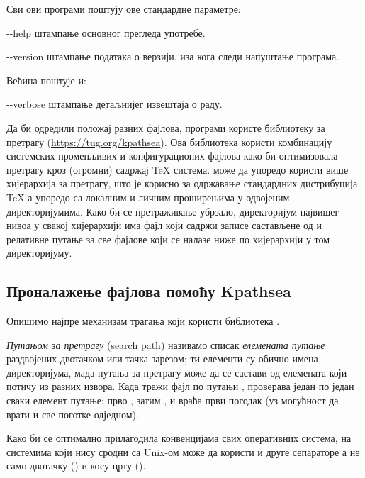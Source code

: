\documentclass{article}
\begin{document}
Сви ови програми поштују ове стандардне \GNU параметре:
\begin{ttdescription}
\item[-{}-help] штампање основног прегледа употребе.
\item[-{}-version] штампање података о верзији, иза кога следи
  напуштање програма.
\end{ttdescription}

Већина поштује и:
\begin{ttdescription}
\item[-{}-verbose] штампање детаљнијег извештаја о раду.
\end{ttdescription}

Да би одредили положај разних фајлова, \Webc{} програми користе
библиотеку за претрагу \KPS{} (\url{https://tug.org/kpathsea}). Ова
библиотека користи комбинацију системских променљивих и
конфигурационих фајлова како би оптимизовала претрагу кроз (огромни)
садржај \TeX{} система. \Webc{} може да упоредо користи више
хијерархија за претрагу, што је корисно за одржавање стандардних
дистрибуција \TeX-а упоредо са локалним и личним проширењима у
одвојеним директоријумима. Како би се претраживање убрзало,
директоријум највишег нивоа у свакој хијерархији има фајл 
који садржи записе састављене од  и релативне путање
за све фајлове који се налазе ниже по хијерархији у том директоријуму.


\subsection{Проналажење фајлова помоћу Kpathsea}
\label{sec:kpathsea}

Опишимо најпре механизам трагања који користи библиотека \KPS{}.

\emph{Путањом за претрагу} (search path) називамо списак
\emph{елемената путање} раздвојених двотачком или тачка-зарезом; ти
елементи су обично имена директоријума, мада путања за претрагу може
да се састави од елемената који потичу из разних извора. Када тражи
фајл  по путањи , \KPS{} проверава један
по један сваки елемент путање: прво , затим
, и враћа први погодак (уз могућност да врати и
све поготке одједном).

Како би се оптимално прилагодила конвенцијама свих оперативних
система, на системима који нису сродни са Unix-ом \KPS{} може да
користи и друге сепараторе а не само двотачку (\samp{:}) и косу црту
(\samp{/}).
\end{document}
